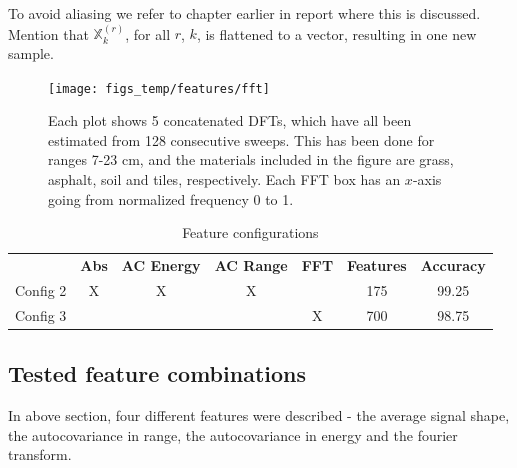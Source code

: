 To avoid aliasing we refer to chapter earlier in report where this is discussed. Mention that $\mathbb{X}_k^{(r)}$, for all $r$, $k$, is flattened to a vector, resulting in one new sample.

\begin{figure}[h]
	\centering
	\texttt{[image: figs\_temp/features/fft]}
	\caption{Each plot shows 5 concatenated DFTs, which have all been estimated from 128 consecutive sweeps. This has been done for ranges 7-23 cm, and the materials included in the figure are grass, asphalt, soil and tiles, respectively. Each FFT box has an $x$-axis going from normalized frequency 0 to 1.}
	\label{fig:fft}
\end{figure}

\begin{table}
\begin{center}
  \begin{tabular}{|c|cccccc|}
\hline
    \rowcolor{gray!150}
		  & \color{white}\textbf{Abs} & \color{white}\textbf{AC Energy} & \color{white}\textbf{AC Range} & \color{white}\textbf{FFT} & \color{white}\textbf{Features} & \color{white}\textbf{Accuracy} \\
	  Config 2 & X & X & X& & 175 & 99.25 \\
	  Config 3 & & & &X & 700 & 98.75\\
\hline
  \end{tabular}
\end{center}
\caption{Feature configurations}
\end{table}


\subsection{Tested feature combinations}

In above section, four different features were described - the average signal shape, the autocovariance in range, the autocovariance in energy and the fourier transform.


